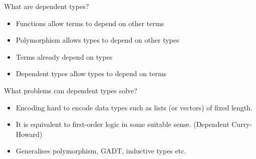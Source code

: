 \documentclass[usenames,dvipsnames]{beamer}
\begin{document}
    
    \begin{frame}{What are dependent types?}
        \begin{itemize}
            \item Functions allow terms to depend on other terms
            \item Polymorphism allows types to depend on other types
            \item Terms already depend on types
            \item Dependent types allow types to depend on terms
        \end{itemize}
        What problems can dependent types solve?
        \begin{itemize}
            \item Encoding hard to encode data types such as lists (or vectors) of fixed length.
            \item It is equivalent to first-order logic in some suitable sense. (Dependent Curry-Howard)
            \item Generalises polymorphism, GADT, inductive types etc.
        \end{itemize}
    \end{frame}
    
\end{document}
